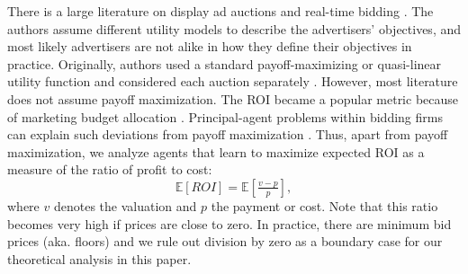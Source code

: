 \documentclass{article}
\begin{document}
There is a large literature on display ad auctions and real-time bidding \citep{despotakis2021first}. The authors assume different utility models to describe the advertisers' objectives, and most likely advertisers are not alike in how they define their objectives in practice. Originally, authors used a standard payoff-maximizing or quasi-linear utility function and considered each auction separately \citep{edelman2007internet, despotakis2021first}. However, most literature does not assume payoff maximization. The ROI became a popular metric because of marketing budget allocation \citep{szymanski2006impact, borgs2007dynamics,jin2018real, wilkens2017gsp}. 
Principal-agent problems within bidding firms can explain such deviations from payoff maximization \citep{bichler2018principal}. 
Thus, apart from payoff maximization, we analyze agents that learn to maximize expected ROI as a measure of the ratio of profit to cost:
\begin{equation*}
	\mathbb{E}[ROI] = \mathbb{E}[\tfrac{v-p}{p}],
\end{equation*}
where $v$ denotes the valuation and $p$ the payment or cost.
Note that this ratio becomes very high if prices are close to zero. {In practice, there are minimum bid prices (aka. floors) and we rule out division by zero as a boundary case for our theoretical analysis in this paper.}
\end{document}
